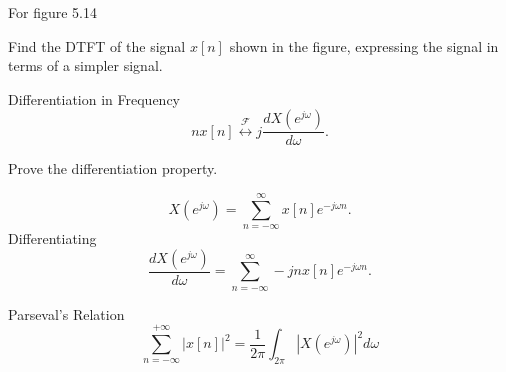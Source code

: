 \begin{frame}
  {
    For figure 5.14
  }
\end{frame}


\begin{frame}
    \begin{example}
        Find the DTFT of the signal $x[n]$ shown in the figure, expressing the signal in terms of a simpler signal.
    \end{example}
    \begin{figure}
        \centering
        
    \end{figure}
\end{frame}

\begin{frame}
    \begin{figure}
        \centering
        
    \end{figure}
\end{frame}

\begin{frame}{Differentiation in Frequency}
    \begin{equation*}
        nx[n] \overset{\mathcal{F}}{\leftrightarrow} j \frac{d X(e^{j\omega})}{d\omega}.
    \end{equation*}
    \begin{example}
        Prove the differentiation property.
    \end{example}
    \pause
    {
        \begin{equation*}
            X(e^{j\omega}) = \sum_{n=-\infty}^{\infty}x[n] e^{-j\omega n}.
        \end{equation*}
        Differentiating
        \begin{equation*}
            \frac{d X(e^{j\omega})}{d\omega} = \sum_{n=-\infty}^{\infty}-jnx[n] e^{-j\omega n}.
        \end{equation*}
    }
\end{frame}
%
\begin{frame}{Parseval's Relation}
    \begin{equation*}
        \sum_{n=-\infty}^{+\infty}|x[n]|^2 = \frac{1}{2\pi}\int_{2\pi} | X(e^{j\omega})|^2d\omega
    \end{equation*}
\end{frame}

